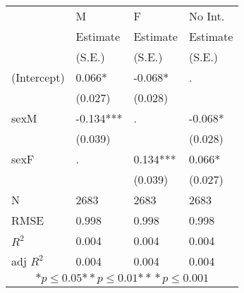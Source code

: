 \begin{tabular}{*{4}{l}}
\hline
                  & M & F & No Int.   \tabularnewline
                   &Estimate   &Estimate   &Estimate \tabularnewline
                 &(S.E.)   &(S.E.)   &(S.E.) \tabularnewline
 \hline
 \hline
   (Intercept)     &0.066* &-0.068*   & .      \tabularnewline
                 &(0.027)   &(0.028)   &        \tabularnewline
   sexM            &-0.134***   & .      &-0.068* \tabularnewline
                 &(0.039)   &         &(0.028)  \tabularnewline
   sexF              & .      &0.134*** &0.066* \tabularnewline
                 &         &(0.039)   &(0.027)  \tabularnewline
 \hline
 N                 &2683       &2683       &2683       \tabularnewline
 RMSE             &0.998   &0.998   &0.998   \tabularnewline
 $R^2$             &0.004   &0.004   &0.004   \tabularnewline
 adj $R^2$         &0.004   &0.004   &0.004   \tabularnewline
 \hline
\hline
 
 \multicolumn{4}{c}{${*  p}\le 0.05$${*\!\!*  p}\le 0.01$${*\!\!*\!\!*  p}\le 0.001$}\tabularnewline
 \end{tabular}
